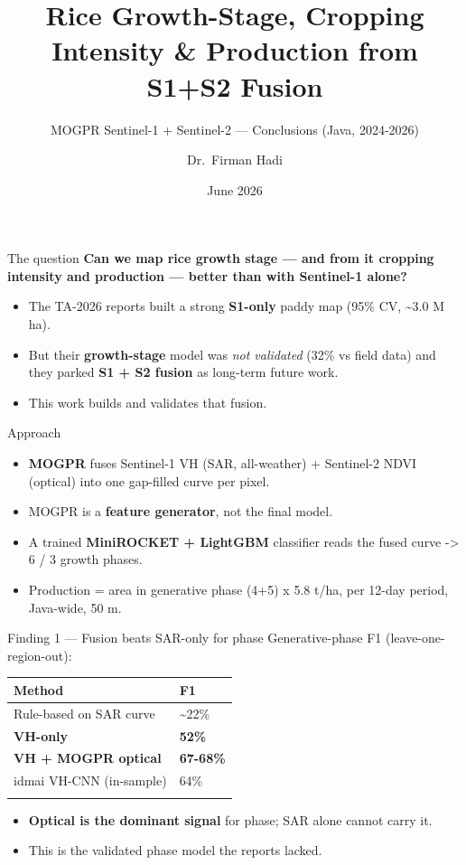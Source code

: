 \documentclass[
  ignorenonframetext,
  aspectratio=169,
]{beamer}
\title{Rice Growth-Stage, Cropping Intensity \& Production from S1+S2
Fusion}
\subtitle{MOGPR Sentinel-1 + Sentinel-2 --- Conclusions (Java,
2024-2026)}
\author{Dr.~Firman Hadi}
\date{June 2026}
\providecommand{\tightlist}{%
  \setlength{\itemsep}{0pt}\setlength{\parskip}{0pt}}
\begin{document}
\frame{\titlepage}

\begin{frame}{The question}
\label{the-question}
\textbf{Can we map rice growth stage --- and from it cropping intensity
and production --- better than with Sentinel-1 alone?}

\begin{itemize}
\tightlist
\item
  The TA-2026 reports built a strong \textbf{S1-only} paddy map (95\%
  CV, \textasciitilde3.0 M ha).
\item
  But their \textbf{growth-stage} model was \emph{not validated} (32\%
  vs field data) and they parked \textbf{S1 + S2 fusion} as long-term
  future work.
\item
  This work builds and validates that fusion.
\end{itemize}
\end{frame}

\begin{frame}{Approach}
\label{approach}
\begin{itemize}
\tightlist
\item
  \textbf{MOGPR} fuses Sentinel-1 VH (SAR, all-weather) + Sentinel-2
  NDVI (optical) into one gap-filled curve per pixel.
\item
  MOGPR is a \textbf{feature generator}, not the final model.
\item
  A trained \textbf{MiniROCKET + LightGBM} classifier reads the fused
  curve -\textgreater{} 6 / 3 growth phases.
\item
  Production = area in generative phase (4+5) x 5.8 t/ha, per 12-day
  period, Java-wide, 50 m.
\end{itemize}
\end{frame}

\begin{frame}{Finding 1 --- Fusion beats SAR-only for phase}
\label{finding-1-fusion-beats-sar-only-for-phase}
Generative-phase F1 (leave-one-region-out):

\begin{longtable}[]{@{}ll@{}}
\toprule\noalign{}
Method & F1 \\
\midrule\noalign{}
\endhead
Rule-based on SAR curve & \textasciitilde22\% \\
\textbf{VH-only} & \textbf{52\%} \\
\textbf{VH + MOGPR optical} & \textbf{67-68\%} \\
idmai VH-CNN (in-sample) & 64\% \\
\bottomrule\noalign{}
\end{longtable}

\begin{itemize}
\tightlist
\item
  \textbf{Optical is the dominant signal} for phase; SAR alone cannot
  carry it.
\item
  This is the validated phase model the reports lacked.
\end{itemize}
\end{frame}
\end{document}
